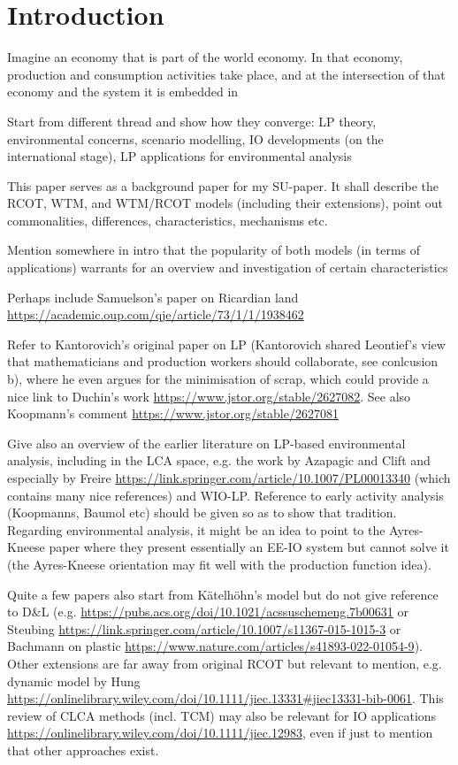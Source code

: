 \section{Introduction}

Imagine an economy that is part of the world economy. In that economy, production and consumption activities take place, and at the intersection of that economy and the system it is embedded in

Start from different thread and show how they converge: LP theory, environmental concerns, scenario modelling, IO developments (on the international stage), LP applications for environmental analysis


This paper serves as a background paper for my SU-paper. It shall describe the RCOT, WTM, and WTM/RCOT models (including their extensions), point out commonalities, differences, characteristics, mechanisms etc.

Mention somewhere in intro that the popularity of both models (in terms of applications) warrants for an overview and investigation of certain characteristics

Perhaps include Samuelson's paper on Ricardian land \url{https://academic.oup.com/qje/article/73/1/1/1938462}

Refer to Kantorovich's original paper on LP (Kantorovich shared Leontief's view that mathematicians and production workers should collaborate, see conlcusion b), where he even argues for the minimisation of scrap, which could provide a nice link to Duchin's work \url{https://www.jstor.org/stable/2627082}. See also Koopmann's comment \url{https://www.jstor.org/stable/2627081}

Give also an overview of the earlier literature on LP-based environmental analysis, including in the LCA space, e.g. the work by Azapagic and Clift and especially by Freire \url{https://link.springer.com/article/10.1007/PL00013340} (which contains many nice references) and WIO-LP. Reference to early activity analysis (Koopmanns, Baumol etc) should be given so as to show that tradition. Regarding environmental analysis, it might be an idea to point to the Ayres-Kneese paper where they present essentially an EE-IO system but cannot solve it (the Ayres-Kneese orientation may fit well with the production function idea).

Quite a few papers also start from Kätelhöhn's model but do not give reference to D\&L (e.g. \url{https://pubs.acs.org/doi/10.1021/acssuschemeng.7b00631} or Steubing \url{https://link.springer.com/article/10.1007/s11367-015-1015-3} or Bachmann on plastic \url{https://www.nature.com/articles/s41893-022-01054-9}). Other extensions are far away from original RCOT but relevant to mention, e.g. dynamic model by Hung \url{https://onlinelibrary.wiley.com/doi/10.1111/jiec.13331#jiec13331-bib-0061}. This review of CLCA methods (incl. TCM) may also be relevant for IO applications \url{https://onlinelibrary.wiley.com/doi/10.1111/jiec.12983}, even if just to mention that other approaches exist.

